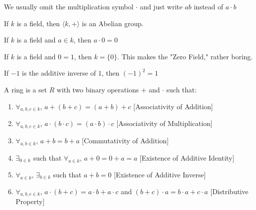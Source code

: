 \documentclass[crop=false,class=book,oneside]{standalone}
\begin{document}
                \begin{remark}
                    We usually omit the multiplication
                    symbol $\cdot$ and just write $ab$ instead
                    of $a\cdot b$
                \end{remark}
                \begin{theorem}
                    If $k$ is a field, then
                    $\langle k,+ \rangle$ is an Abelian group.
                \end{theorem}
                \begin{theorem}
                    If $k$ is a field and $a\in k$,
                    then $a\cdot 0=0$
                \end{theorem}
                \begin{remark}
                    If $k$ is a field and $0=1$, then $k=\{0\}$.
                    This makes the "Zero Field," rather boring.
                \end{remark}
                \begin{theorem}
                    If $-1$ is the additive inverse of $1$,
                    then $(-1)^2=1$
                \end{theorem}
                \begin{definition}
                    A ring is a set $R$ with two binary
                    operations $+$ and $\cdot$ such that:
                    \begin{enumerate}
                        \item $\forall_{a,b,c\in k}$,
                              $a+(b+c)=(a+b)+c$
                              \hfill[Associativity of Addition]
                        \item $\forall_{a,b,c\in k}$,
                              $a\cdot(b\cdot c)=(a\cdot b)\cdot c$
                              \hfill[Associativity of Multiplication]
                        \item $\forall_{a,b\in k}$,
                              $a+b=b+a$
                              \hfill[Commutativity of Addition]
                        \item $\exists_{0 \in k}$ such that
                              $\forall_{a\in k}$,
                              $a+0=0+a=a$
                              \hfill[Existence of Additive Identity]
                        \item $\forall_{a\in k}$,
                              $\exists_{b\in k}$ such that $a+b=0$
                              \hfill[Existence of Additive Inverse]
                        \item $\forall_{a,b,c\in k}$,
                              $a\cdot(b+c)=a\cdot b+a\cdot c$
                              and $(b+c)\cdot a=b\cdot a+c\cdot a$
                              \hfill [Distributive Property]
                    \end{enumerate}
                \end{definition}
\end{document}
